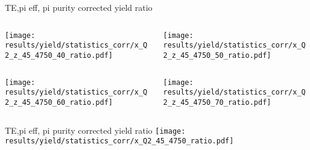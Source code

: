 \begin{frame}{TE,pi eff, pi purity corrected yield ratio}
\begin{columns}
\begin{column}[T]{0.5\textwidth}
\texttt{[image: results/yield/statistics\_corr/x\_Q2\_z\_45\_4750\_40\_ratio.pdf]}
\end{column}
\begin{column}[T]{0.5\textwidth}
\texttt{[image: results/yield/statistics\_corr/x\_Q2\_z\_45\_4750\_50\_ratio.pdf]}
\end{column}
\end{columns}
\begin{columns}
\begin{column}[T]{0.5\textwidth}
\texttt{[image: results/yield/statistics\_corr/x\_Q2\_z\_45\_4750\_60\_ratio.pdf]}
\end{column}
\begin{column}[T]{0.5\textwidth}
\texttt{[image: results/yield/statistics\_corr/x\_Q2\_z\_45\_4750\_70\_ratio.pdf]}
\end{column}
\end{columns}
\end{frame}
\begin{frame}{TE,pi eff, pi purity corrected yield ratio}
\texttt{[image: results/yield/statistics\_corr/x\_Q2\_45\_4750\_ratio.pdf]}
\end{frame}
